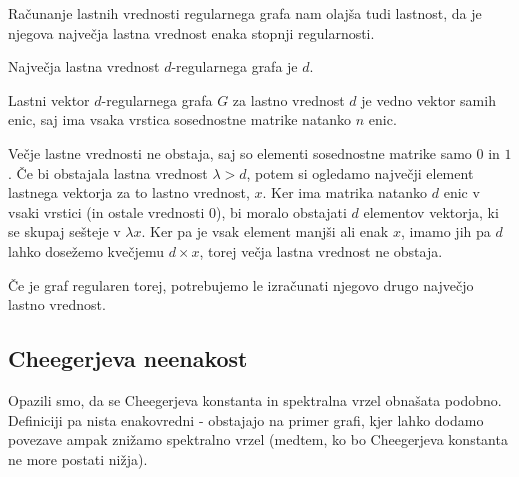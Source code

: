 Računanje lastnih vrednosti regularnega grafa nam olajša tudi lastnost, da je njegova največja lastna vrednost enaka stopnji regularnosti.
\begin{izrek}
    Največja lastna vrednost \(d\)-regularnega grafa je \(d\).
\end{izrek}
\begin{dokaz}
    Lastni vektor \(d\)-regularnega grafa \(G\) za lastno vrednost \(d\) je vedno vektor samih enic, saj ima vsaka vrstica sosednostne matrike natanko \(n\) enic.

    Večje lastne vrednosti ne obstaja, saj so elementi sosednostne matrike samo \(0\) in \(1\). Če bi obstajala lastna vrednost \(\lambda > d\), potem si ogledamo največji element lastnega vektorja za to lastno vrednost, \(x\). Ker ima matrika natanko \(d\) enic v vsaki vrstici (in ostale vrednosti \(0\)), bi moralo obstajati \(d\) elementov vektorja, ki se skupaj sešteje v \(\lambda x\). Ker pa je vsak element manjši ali enak \(x\), imamo jih pa \(d\) lahko dosežemo kvečjemu \(d \times x\), torej večja lastna vrednost ne obstaja.
\end{dokaz}
Če je graf regularen torej, potrebujemo le izračunati njegovo drugo največjo lastno vrednost.
\subsection{Cheegerjeva neenakost}
Opazili smo, da se Cheegerjeva konstanta in spektralna vrzel obnašata podobno. Definiciji pa nista enakovredni - obstajajo na primer grafi, kjer lahko dodamo povezave ampak znižamo spektralno vrzel (medtem, ko bo Cheegerjeva konstanta ne more postati nižja).

